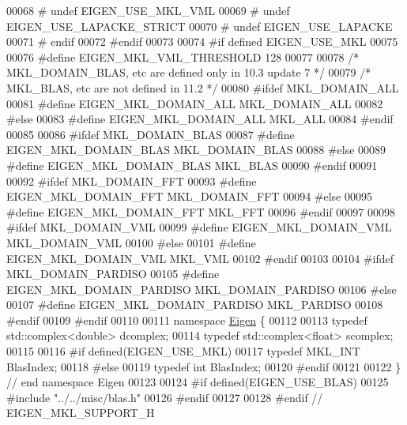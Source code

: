 \begin{DoxyCode}
00068 \textcolor{preprocessor}{#       undef   EIGEN\_USE\_MKL\_VML}
00069 \textcolor{preprocessor}{#       undef   EIGEN\_USE\_LAPACKE\_STRICT}
00070 \textcolor{preprocessor}{#       undef   EIGEN\_USE\_LAPACKE}
00071 \textcolor{preprocessor}{#   endif}
00072 \textcolor{preprocessor}{#endif}
00073 
00074 \textcolor{preprocessor}{#if defined EIGEN\_USE\_MKL}
00075 
00076 \textcolor{preprocessor}{#define EIGEN\_MKL\_VML\_THRESHOLD 128}
00077 
00078 \textcolor{comment}{/* MKL\_DOMAIN\_BLAS, etc are defined only in 10.3 update 7 */}
00079 \textcolor{comment}{/* MKL\_BLAS, etc are not defined in 11.2 */}
00080 \textcolor{preprocessor}{#ifdef MKL\_DOMAIN\_ALL}
00081 \textcolor{preprocessor}{#define EIGEN\_MKL\_DOMAIN\_ALL MKL\_DOMAIN\_ALL}
00082 \textcolor{preprocessor}{#else}
00083 \textcolor{preprocessor}{#define EIGEN\_MKL\_DOMAIN\_ALL MKL\_ALL}
00084 \textcolor{preprocessor}{#endif}
00085 
00086 \textcolor{preprocessor}{#ifdef MKL\_DOMAIN\_BLAS}
00087 \textcolor{preprocessor}{#define EIGEN\_MKL\_DOMAIN\_BLAS MKL\_DOMAIN\_BLAS}
00088 \textcolor{preprocessor}{#else}
00089 \textcolor{preprocessor}{#define EIGEN\_MKL\_DOMAIN\_BLAS MKL\_BLAS}
00090 \textcolor{preprocessor}{#endif}
00091 
00092 \textcolor{preprocessor}{#ifdef MKL\_DOMAIN\_FFT}
00093 \textcolor{preprocessor}{#define EIGEN\_MKL\_DOMAIN\_FFT MKL\_DOMAIN\_FFT}
00094 \textcolor{preprocessor}{#else}
00095 \textcolor{preprocessor}{#define EIGEN\_MKL\_DOMAIN\_FFT MKL\_FFT}
00096 \textcolor{preprocessor}{#endif}
00097 
00098 \textcolor{preprocessor}{#ifdef MKL\_DOMAIN\_VML}
00099 \textcolor{preprocessor}{#define EIGEN\_MKL\_DOMAIN\_VML MKL\_DOMAIN\_VML}
00100 \textcolor{preprocessor}{#else}
00101 \textcolor{preprocessor}{#define EIGEN\_MKL\_DOMAIN\_VML MKL\_VML}
00102 \textcolor{preprocessor}{#endif}
00103 
00104 \textcolor{preprocessor}{#ifdef MKL\_DOMAIN\_PARDISO}
00105 \textcolor{preprocessor}{#define EIGEN\_MKL\_DOMAIN\_PARDISO MKL\_DOMAIN\_PARDISO}
00106 \textcolor{preprocessor}{#else}
00107 \textcolor{preprocessor}{#define EIGEN\_MKL\_DOMAIN\_PARDISO MKL\_PARDISO}
00108 \textcolor{preprocessor}{#endif}
00109 \textcolor{preprocessor}{#endif}
00110 
00111 \textcolor{keyword}{namespace }\hyperlink{namespace_eigen}{Eigen} \{
00112 
00113 \textcolor{keyword}{typedef} std::complex<double> dcomplex;
00114 \textcolor{keyword}{typedef} std::complex<float>  scomplex;
00115 
00116 \textcolor{preprocessor}{#if defined(EIGEN\_USE\_MKL)}
00117 \textcolor{keyword}{typedef} MKL\_INT BlasIndex;
00118 \textcolor{preprocessor}{#else}
00119 \textcolor{keyword}{typedef} \textcolor{keywordtype}{int} BlasIndex;
00120 \textcolor{preprocessor}{#endif}
00121 
00122 \} \textcolor{comment}{// end namespace Eigen}
00123 
00124 \textcolor{preprocessor}{#if defined(EIGEN\_USE\_BLAS)}
00125 \textcolor{preprocessor}{#include "../../misc/blas.h"}
00126 \textcolor{preprocessor}{#endif}
00127 
00128 \textcolor{preprocessor}{#endif // EIGEN\_MKL\_SUPPORT\_H}
\end{DoxyCode}
